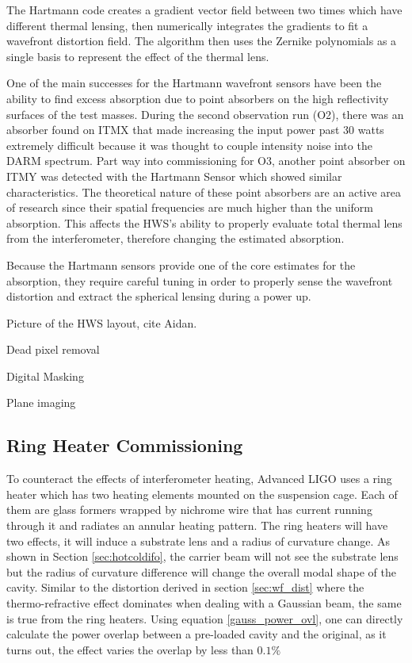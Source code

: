 	The Hartmann code creates a gradient vector field between two times which have different thermal lensing, then numerically integrates the gradients to fit a wavefront distortion field.  The algorithm then uses the Zernike polynomials as a single basis to represent the effect of the thermal lens.
	
	One of the main successes for the Hartmann wavefront sensors have been the ability to find excess absorption due to point absorbers on the high reflectivity surfaces of the test masses.  During the second observation run (O2), there was an absorber found on ITMX that made increasing the input power past 30 watts extremely difficult because it was thought to couple intensity noise into the DARM spectrum.  Part way into commissioning for O3, another point absorber on ITMY was detected with the Hartmann Sensor which showed similar characteristics.  The theoretical nature of these point absorbers are an active area of research since their spatial frequencies are much higher than the uniform absorption.  This affects the HWS's ability to properly evaluate total thermal lens from the interferometer, therefore changing the estimated absorption.
	
	Because the Hartmann sensors provide one of the core estimates for the absorption, they require careful tuning in order to properly sense the wavefront distortion and extract the spherical lensing during a power up.
	
	Picture of the HWS layout, cite Aidan.
	
	Dead pixel removal
	
	Digital Masking
	
	Plane imaging
	\cite{AWC_current}
	
	\subsection{Ring Heater Commissioning}\label{Sec:RH}
	To counteract the effects of interferometer heating, Advanced LIGO uses a ring heater \cite{ramette_analytical} \cite{wang_thermalmodel} which has two heating elements mounted on the suspension cage. Each of them are glass formers wrapped by nichrome wire that has current running through it and radiates an annular heating pattern. The ring heaters will have two effects, it will induce a substrate lens and a radius of curvature change.  As shown in Section \ref{sec:hotcoldifo}, the carrier beam will not see the substrate lens but the radius of curvature difference will change the overall modal shape of the cavity.  Similar to the distortion derived in section \ref{sec:wf_dist} where the thermo-refractive effect dominates when dealing with a Gaussian beam, the same is true from the ring heaters. Using equation \ref{gauss_power_ovl}, one can directly calculate the power overlap between a pre-loaded cavity and the original, as it turns out, the effect varies the overlap by less than $0.1\%$


